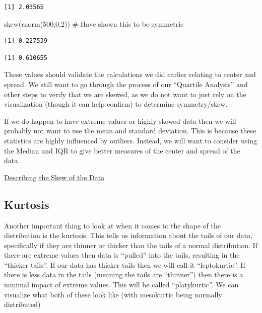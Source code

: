 \documentclass[
  letterpaper,
  DIV=11,
  numbers=noendperiod]{scrreprt}
\newenvironment{Shaded}{\begin{snugshade}}{\end{snugshade}}
\newcommand{\CommentTok}[1]{\textcolor[rgb]{0.37,0.37,0.37}{#1}}
\newcommand{\DecValTok}[1]{\textcolor[rgb]{0.68,0.00,0.00}{#1}}
\newcommand{\FunctionTok}[1]{\textcolor[rgb]{0.28,0.35,0.67}{#1}}
\newcommand{\NormalTok}[1]{\textcolor[rgb]{0.00,0.23,0.31}{#1}}
\newcommand{\SpecialCharTok}[1]{\textcolor[rgb]{0.37,0.37,0.37}{#1}}
\begin{document}
\begin{verbatim}
[1] 2.03565
\end{verbatim}

\begin{Shaded}
\begin{Highlighting}[]
\FunctionTok{skew}\NormalTok{(}\FunctionTok{rnorm}\NormalTok{(}\DecValTok{500}\NormalTok{,}\DecValTok{0}\NormalTok{,}\DecValTok{2}\NormalTok{)) }\CommentTok{\# Have shown this to be symmetric}
\end{Highlighting}
\end{Shaded}

\begin{verbatim}
[1] 0.227539
\end{verbatim}

\begin{Shaded}
\end{Shaded}

\begin{verbatim}
[1] 0.610655
\end{verbatim}

These values should validate the calculations we did earlier relating to
center and spread. We still want to go through the process of our
``Quartile Analysis'' and other steps to verify that we are skewed, as
we do not want to just rely on the visualization (though it can help
confirm) to determine symmetry/skew.

If we do happen to have extreme values or highly skewed data then we
will probably not want to use the mean and standard deviation. This is
because these statistics are highly influenced by outliers. Instead, we
will want to consider using the Median and IQR to give better measures
of the center and spread of the data.

\begin{watch}{}{}
    \href{https://youtu.be/_VHtL0hgaKA}{Describing the Skew of the Data}
\end{watch}

\subsection{Kurtosis}\label{kurtosis}

Another important thing to look at when it comes to the shape of the
distribution is the kurtosis. This tells us information about the tails
of our data, specifically if they are thinner or thicker than the tails
of a normal distribution. If there are extreme values then data is
``pulled'' into the tails, resulting in the ``thicker tails''. If our
data has thicker tails then we will call it ``leptokurtic''. If there is
less data in the tails (meaning the tails are ``thinner'') then there is
a minimal impact of extreme values. This will be called ``platykurtic''.
We can visualize what both of these look like (with mesokurtic being
normally distributed)
\end{document}
